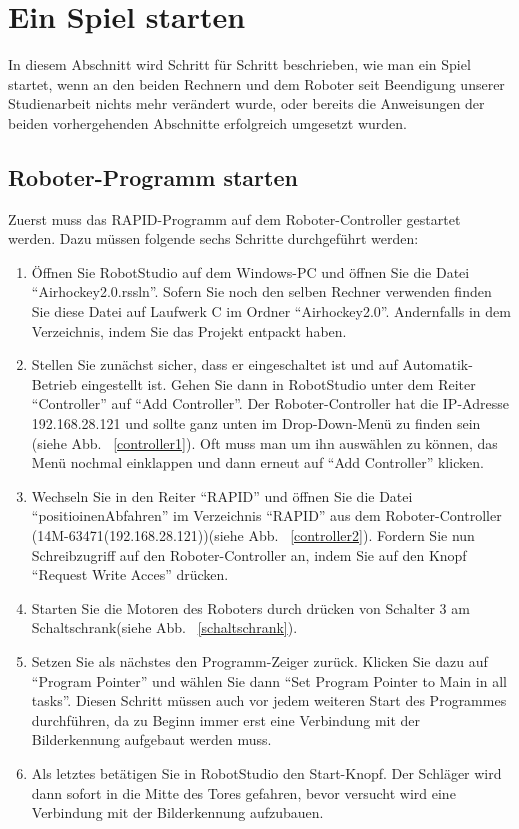 \section{Ein Spiel starten}
\label{starten}
In diesem Abschnitt wird Schritt für Schritt beschrieben, wie man ein Spiel startet, wenn an den beiden Rechnern und dem Roboter seit Beendigung unserer Studienarbeit nichts mehr verändert wurde, oder bereits die Anweisungen der beiden vorhergehenden Abschnitte erfolgreich umgesetzt wurden.

\subsection{Roboter-Programm starten} 
Zuerst muss das RAPID-Programm auf dem Roboter-Controller gestartet werden. Dazu müssen folgende sechs Schritte durchgeführt werden:  
\begin{enumerate}
\item Öffnen Sie RobotStudio auf dem Windows-PC und öffnen Sie die Datei \enquote{Airhockey2.0.rssln}. Sofern Sie noch den selben Rechner verwenden finden Sie diese Datei auf Laufwerk C im Ordner \enquote{Airhockey2.0}. Andernfalls in dem Verzeichnis, indem Sie das Projekt entpackt haben. 

\item Stellen Sie zunächst sicher, dass er eingeschaltet ist und auf Automatik-Betrieb eingestellt ist. Gehen Sie dann in RobotStudio unter dem Reiter \enquote{Controller} auf \enquote{Add Controller}. Der Roboter-Controller hat die IP-Adresse 192.168.28.121 und sollte ganz unten im Drop-Down-Menü zu finden sein (siehe Abb. ~\ref{controller1}). Oft muss man um ihn auswählen zu können, das Menü nochmal einklappen und dann erneut auf \enquote{Add Controller} klicken.

\item Wechseln Sie in den Reiter \enquote{RAPID} und öffnen Sie die Datei \enquote{positioinenAbfahren} im Verzeichnis \enquote{RAPID} aus dem Roboter-Controller (14M-63471(192.168.28.121))(siehe Abb. ~\ref{controller2}). Fordern Sie nun Schreibzugriff auf den Roboter-Controller an, indem Sie auf den Knopf \enquote{Request Write Acces} drücken. 

\item Starten Sie die Motoren des Roboters durch drücken von Schalter 3 am Schaltschrank(siehe Abb. ~\ref{schaltschrank}).

\item Setzen Sie als nächstes den Programm-Zeiger zurück. Klicken Sie dazu auf \enquote{Program Pointer} und wählen Sie dann \enquote{Set Program Pointer to Main in all tasks}. Diesen Schritt müssen auch vor jedem weiteren Start des Programmes durchführen, da zu Beginn immer erst eine Verbindung mit der Bilderkennung aufgebaut werden muss.

\item Als letztes betätigen Sie in RobotStudio den Start-Knopf. Der Schläger wird dann sofort in die Mitte des Tores gefahren, bevor versucht wird eine Verbindung mit der Bilderkennung aufzubauen.    
\end{enumerate}

